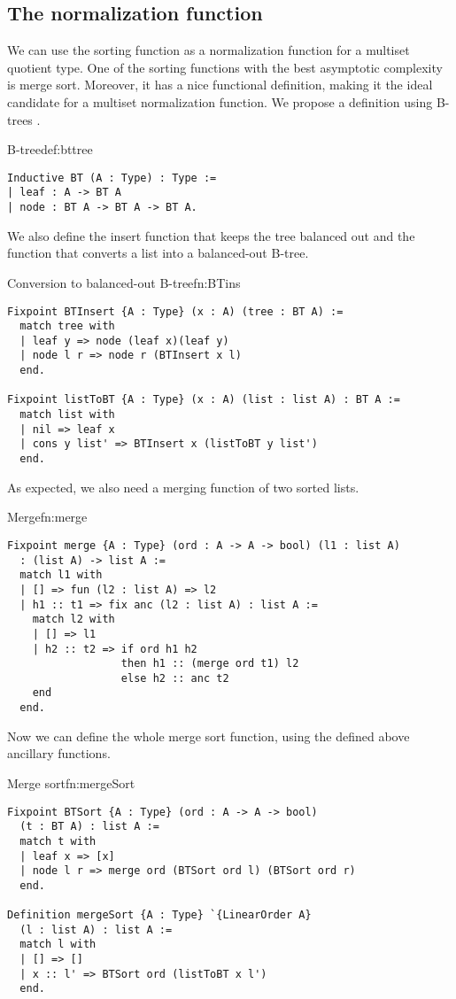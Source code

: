 \subsection{The normalization function}
We can use the sorting function as a normalization function for a multiset quotient type. One of the sorting functions with the best asymptotic complexity is merge sort. Moreover, it has a nice functional definition, making it the ideal candidate for a multiset normalization function. We propose a definition using B-trees \cite{Btree}.
\begin{defi}{B-tree}{def:bttree}
\begin{verbatim}
Inductive BT (A : Type) : Type :=
| leaf : A -> BT A
| node : BT A -> BT A -> BT A.
\end{verbatim}
\end{defi}
We also define the insert function that keeps the tree balanced out and the function that converts a list into a balanced-out B-tree.
\begin{func}{Conversion to balanced-out B-tree}{fn:BTins}
\begin{verbatim}
Fixpoint BTInsert {A : Type} (x : A) (tree : BT A) :=
  match tree with
  | leaf y => node (leaf x)(leaf y)
  | node l r => node r (BTInsert x l)
  end.

Fixpoint listToBT {A : Type} (x : A) (list : list A) : BT A :=
  match list with
  | nil => leaf x
  | cons y list' => BTInsert x (listToBT y list')
  end.
\end{verbatim}
\end{func}
As expected, we also need a merging function of two sorted lists.
\begin{func}{Merge}{fn:merge}
\begin{verbatim}
Fixpoint merge {A : Type} (ord : A -> A -> bool) (l1 : list A) 
  : (list A) -> list A :=
  match l1 with
  | [] => fun (l2 : list A) => l2
  | h1 :: t1 => fix anc (l2 : list A) : list A :=
    match l2 with
    | [] => l1
    | h2 :: t2 => if ord h1 h2 
                  then h1 :: (merge ord t1) l2
                  else h2 :: anc t2
    end
  end.
\end{verbatim}
\end{func}
Now we can define the whole merge sort function, using the defined above ancillary functions.
\begin{func}{Merge sort}{fn:mergeSort}
\begin{verbatim}
Fixpoint BTSort {A : Type} (ord : A -> A -> bool) 
  (t : BT A) : list A :=
  match t with
  | leaf x => [x]
  | node l r => merge ord (BTSort ord l) (BTSort ord r)
  end. 

Definition mergeSort {A : Type} `{LinearOrder A}
  (l : list A) : list A :=
  match l with
  | [] => []
  | x :: l' => BTSort ord (listToBT x l')
  end.
\end{verbatim}
\end{func}

